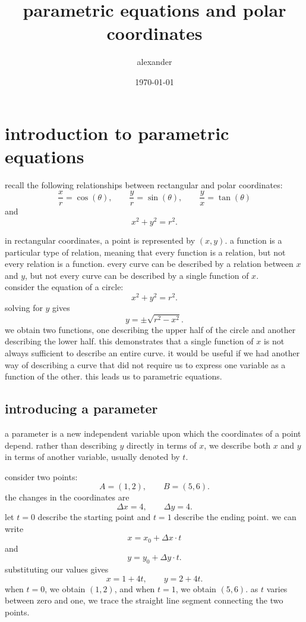 \documentclass{article}
\author{alexander}
\date{\today}
\title{parametric equations and polar coordinates}
\begin{document}
\maketitle

\section{introduction to parametric equations}

recall the following relationships between rectangular and polar coordinates:
\[
\frac{x}{r}=\cos(\theta),\qquad
\frac{y}{r}=\sin(\theta),\qquad
\frac{y}{x}=\tan(\theta)
\]
and
\[
x^2+y^2=r^2.
\]

in rectangular coordinates, a point is represented by $(x,y)$. a function is a particular type of relation, meaning that every function is a relation, but not every relation is a function. every curve can be described by a relation between $x$ and $y$, but not every curve can be described by a single function of $x$.\\

consider the equation of a circle:
\[
x^2+y^2=r^2.
\]
solving for $y$ gives
\[
y=\pm\sqrt{r^2-x^2}.
\]
we obtain two functions, one describing the upper half of the circle and another describing the lower half. this demonstrates that a single function of $x$ is not always sufficient to describe an entire curve. it would be useful if we had another way of describing a curve that did not require us to express one variable as a function of the other. this leads us to parametric equations.\\

\subsection{introducing a parameter}

a parameter is a new independent variable upon which the coordinates of a point depend. rather than describing $y$ directly in terms of $x$, we describe both $x$ and $y$ in terms of another variable, usually denoted by $t$.

consider two points:
\[
A=(1,2),\qquad B=(5,6).
\]
the changes in the coordinates are
\[
\Delta x=4,\qquad \Delta y=4.
\]
let $t=0$ describe the starting point and $t=1$ describe the ending point. we can write
\[
x=x_0+\Delta x\cdot t
\]
and
\[
y=y_0+\Delta y\cdot t.
\]
substituting our values gives
\[
x=1+4t,\qquad y=2+4t.
\]
when $t=0$, we obtain $(1,2)$, and when $t=1$, we obtain $(5,6)$. as $t$ varies between zero and one, we trace the straight line segment connecting the two points.\\
\end{document}
